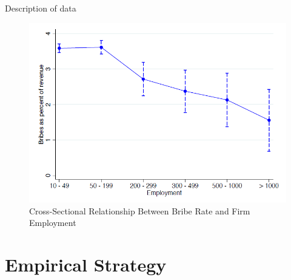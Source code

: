 \documentclass{beamer}
\begin{document}
\begin{frame}{Description of data}

\begin{figure}
\centering
\includegraphics[width=0.8\linewidth]{7.png}
\caption{Cross-Sectional Relationship Between Bribe Rate and Firm Employment}
\end{figure}

\end{frame}

\section{Empirical Strategy}
\end{document}
